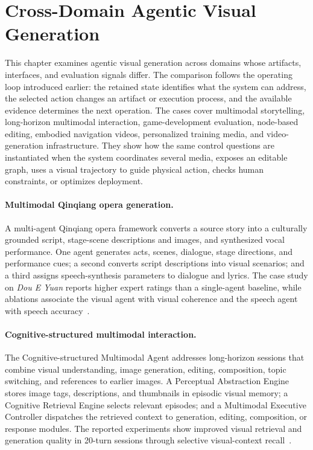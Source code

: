 \section{Cross-Domain Agentic Visual Generation}
\label{sec:cross-domain}

This chapter examines agentic visual generation across domains whose artifacts, interfaces, and evaluation signals differ. The comparison follows the operating loop introduced earlier: the retained state identifies what the system can address, the selected action changes an artifact or execution process, and the available evidence determines the next operation. The cases cover multimodal storytelling, long-horizon multimodal interaction, game-development evaluation, node-based editing, embodied navigation videos, personalized training media, and video-generation infrastructure. They show how the same control questions are instantiated when the system coordinates several media, exposes an editable graph, uses a visual trajectory to guide physical action, checks human constraints, or optimizes deployment.

\paragraph{Multimodal Qinqiang opera generation.}
A multi-agent Qinqiang opera framework converts a source story into a culturally grounded script, stage-scene descriptions and images, and synthesized vocal performance. One agent generates acts, scenes, dialogue, stage directions, and performance cues; a second converts script descriptions into visual scenarios; and a third assigns speech-synthesis parameters to dialogue and lyrics. The case study on \emph{Dou E Yuan} reports higher expert ratings than a single-agent baseline, while ablations associate the visual agent with visual coherence and the speech agent with speech accuracy~\cite{avg250415552}.

\paragraph{Cognitive-structured multimodal interaction.}
The Cognitive-structured Multimodal Agent addresses long-horizon sessions that combine visual understanding, image generation, editing, composition, topic switching, and references to earlier images. A Perceptual Abstraction Engine stores image tags, descriptions, and thumbnails in episodic visual memory; a Cognitive Retrieval Engine selects relevant episodes; and a Multimodal Executive Controller dispatches the retrieved context to generation, editing, composition, or response modules. The reported experiments show improved visual retrieval and generation quality in 20-turn sessions through selective visual-context recall~\cite{avg260708497}.

